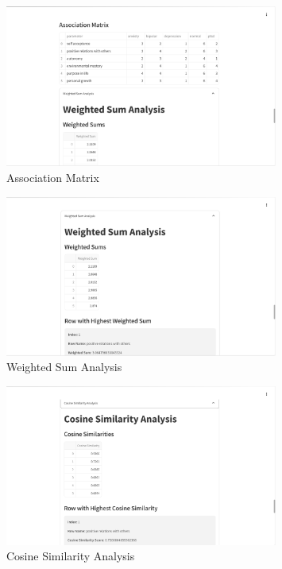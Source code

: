\begin{figure}[h!]  
    \centering
    \includegraphics[width=0.8\textwidth]{App Images/21 Interface.png}  
    \caption{Association Matrix}
    \label{10i23445}  %
\end{figure} 

\begin{figure}[h!]  
    \centering
    \includegraphics[width=0.8\textwidth]{App Images/22 Interface.png}  
    \caption{Weighted Sum Analysis}
    \label{10i23445}  %
\end{figure} 

\pagebreak

\begin{figure}[h!]  
    \centering
    \includegraphics[width=0.8\textwidth]{App Images/23 Interface.png}  
    \caption{Cosine Similarity Analysis}
    \label{10i23445}  %
\end{figure} 

